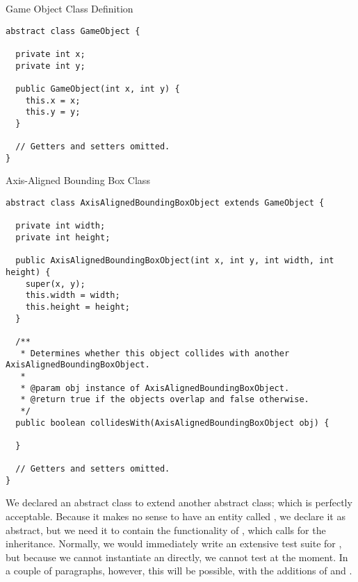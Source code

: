 \begin{cl}{Game Object Class Definition}
\begin{lstlisting}[language=MyJava]
abstract class GameObject {
  
  private int x;
  private int y;

  public GameObject(int x, int y) {
    this.x = x;
    this.y = y;
  }

  // Getters and setters omitted.
}
\end{lstlisting}
\end{cl}

\begin{cl}{Axis-Aligned Bounding Box Class}
\begin{lstlisting}[language=Myjava]
abstract class AxisAlignedBoundingBoxObject extends GameObject {
  
  private int width;
  private int height;

  public AxisAlignedBoundingBoxObject(int x, int y, int width, int height) {
    super(x, y);
    this.width = width;
    this.height = height;
  }

  /**
   * Determines whether this object collides with another AxisAlignedBoundingBoxObject.
   *
   * @param obj instance of AxisAlignedBoundingBoxObject.
   * @return true if the objects overlap and false otherwise.
   */
  public boolean collidesWith(AxisAlignedBoundingBoxObject obj) {
    
  }
  
  // Getters and setters omitted.
}
\end{lstlisting}
\end{cl}

We declared an abstract class to extend another abstract class; which is perfectly acceptable. Because it makes no sense to have an entity called , we declare it as abstract, but we need it to contain the functionality of , which calls for the inheritance. Normally, we would immediately write an extensive test suite for , but because we cannot instantiate an  directly, we cannot test  at the moment. In a couple of paragraphs, however, this will be possible, with the additions of  and .


